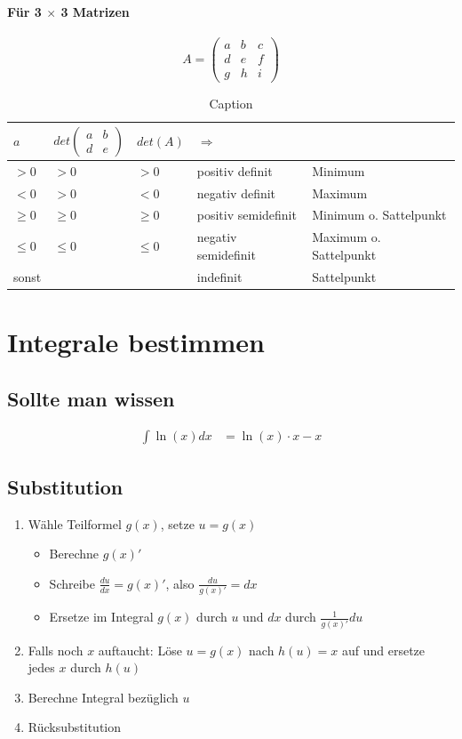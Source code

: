 \documentclass{article} %
\newcommand{\Ra}[0]{\Rightarrow}
\newcommand{\ram}[0]{$\Ra$ }
\begin{document}
\paragraph{Für 3 $\times$ 3 Matrizen}
\[
A  = \begin{pmatrix}
a & b & c\\   d & e & f \\ g & h & i
\end{pmatrix}
\]
\begin{table}[H]
    \centering
    \begin{tabular}{l|l|l|ll}
       $a$  & $det \begin{pmatrix}a&b \\ d & e \end{pmatrix}$  & $det(A)$ & \ram    \\ \hline
       $> 0$  & $ > 0$ & $>0$ & positiv definit & Minimum \\
       $<0$&$>0$&$<0$ & negativ definit & Maximum\\
       $\geq0$&$\geq0$&$\geq0$& positiv semidefinit & Minimum o. Sattelpunkt \\
       $\leq0$&$\leq0$&$\leq0$& negativ semidefinit & Maximum o. Sattelpunkt \\
       sonst & & & indefinit & Sattelpunkt
    \end{tabular}
    \caption{Caption}
    \label{tab:my_label}
\end{table}


\section{Integrale bestimmen}
\subsection{Sollte man wissen}
\begin{align}
    \int \ln(x) dx &= \ln(x) \cdot x -x
\end{align}
\subsection{Substitution}
\begin{enumerate}
    \item Wähle Teilformel $g(x)$, setze $u = g(x)$
    \begin{itemize}
        \item Berechne $g(x)'$
        \item Schreibe $\frac{du}{dx} = g(x)'$, also $\frac{du}{g(x)'} = dx$
        \item Ersetze im Integral $g(x)$ durch $u$ und $dx$ durch $\frac{1}{g(x)'} du$
    \end{itemize}
    \item Falls noch $x$ auftaucht: Löse $u= g(x)$ nach $h(u) = x$ auf und ersetze jedes $x$ durch $h(u)$
    \item Berechne Integral bezüglich $u$
    \item Rücksubstitution
\end{enumerate}
\end{document}
